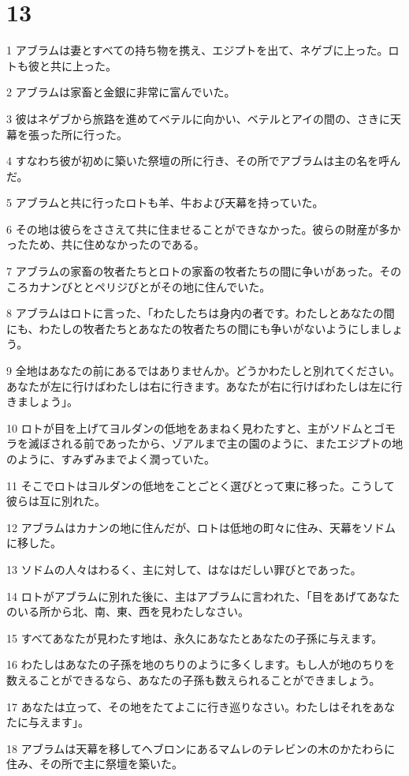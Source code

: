 \chapter{13}

\par 1 アブラムは妻とすべての持ち物を携え、エジプトを出て、ネゲブに上った。ロトも彼と共に上った。
\par 2 アブラムは家畜と金銀に非常に富んでいた。
\par 3 彼はネゲブから旅路を進めてベテルに向かい、ベテルとアイの間の、さきに天幕を張った所に行った。
\par 4 すなわち彼が初めに築いた祭壇の所に行き、その所でアブラムは主の名を呼んだ。
\par 5 アブラムと共に行ったロトも羊、牛および天幕を持っていた。
\par 6 その地は彼らをささえて共に住ませることができなかった。彼らの財産が多かったため、共に住めなかったのである。
\par 7 アブラムの家畜の牧者たちとロトの家畜の牧者たちの間に争いがあった。そのころカナンびととペリジびとがその地に住んでいた。
\par 8 アブラムはロトに言った、「わたしたちは身内の者です。わたしとあなたの間にも、わたしの牧者たちとあなたの牧者たちの間にも争いがないようにしましょう。
\par 9 全地はあなたの前にあるではありませんか。どうかわたしと別れてください。あなたが左に行けばわたしは右に行きます。あなたが右に行けばわたしは左に行きましょう」。
\par 10 ロトが目を上げてヨルダンの低地をあまねく見わたすと、主がソドムとゴモラを滅ぼされる前であったから、ゾアルまで主の園のように、またエジプトの地のように、すみずみまでよく潤っていた。
\par 11 そこでロトはヨルダンの低地をことごとく選びとって東に移った。こうして彼らは互に別れた。
\par 12 アブラムはカナンの地に住んだが、ロトは低地の町々に住み、天幕をソドムに移した。
\par 13 ソドムの人々はわるく、主に対して、はなはだしい罪びとであった。
\par 14 ロトがアブラムに別れた後に、主はアブラムに言われた、「目をあげてあなたのいる所から北、南、東、西を見わたしなさい。
\par 15 すべてあなたが見わたす地は、永久にあなたとあなたの子孫に与えます。
\par 16 わたしはあなたの子孫を地のちりのように多くします。もし人が地のちりを数えることができるなら、あなたの子孫も数えられることができましょう。
\par 17 あなたは立って、その地をたてよこに行き巡りなさい。わたしはそれをあなたに与えます」。
\par 18 アブラムは天幕を移してヘブロンにあるマムレのテレビンの木のかたわらに住み、その所で主に祭壇を築いた。

